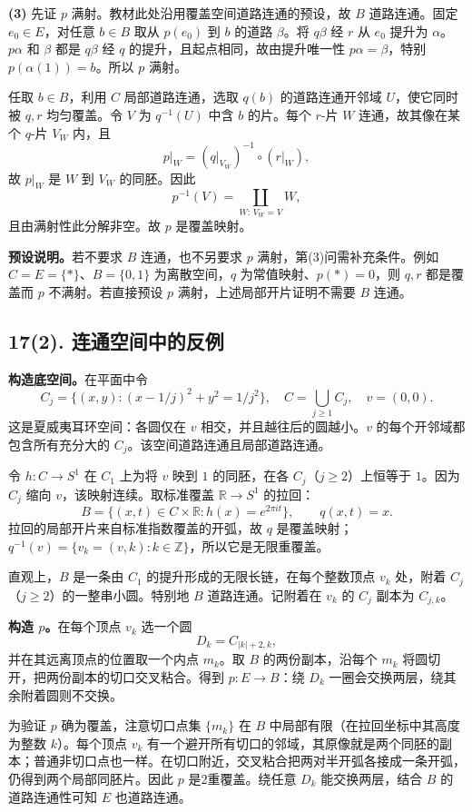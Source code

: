 \documentclass[UTF8,11pt,a4paper]{ctexart}
\newcommand{\R}{\mathbb R}\newcommand{\Z}{\mathbb Z}\newcommand{\C}{\mathbb C}
\begin{document}
\textbf{(3)} 先证 $p$ 满射。教材此处沿用覆盖空间道路连通的预设，故 $B$ 道路连通。固定 $e_0\in E$，对任意 $b\in B$ 取从 $p(e_0)$ 到 $b$ 的道路 $\beta$。将 $q\beta$ 经 $r$ 从 $e_0$ 提升为 $\alpha$。$p\alpha$ 和 $\beta$ 都是 $q\beta$ 经 $q$ 的提升，且起点相同，故由提升唯一性 $p\alpha=\beta$，特别 $p(\alpha(1))=b$。所以 $p$ 满射。

任取 $b\in B$，利用 $C$ 局部道路连通，选取 $q(b)$ 的道路连通开邻域 $U$，使它同时被 $q,r$ 均匀覆盖。令 $V$ 为 $q^{-1}(U)$ 中含 $b$ 的片。每个 $r$-片 $W$ 连通，故其像在某个 $q$-片 $V_W$ 内，且
\[p|_W=(q|_{V_W})^{-1}\circ(r|_W),\]
故 $p|_W$ 是 $W$ 到 $V_W$ 的同胚。因此
\[p^{-1}(V)=\coprod_{W:\,V_W=V}W,\]
且由满射性此分解非空。故 $p$ 是覆盖映射。

\textbf{预设说明。}若不要求 $B$ 连通，也不另要求 $p$ 满射，第(3)问需补充条件。例如 $C=E=\{*\}$、$B=\{0,1\}$ 为离散空间，$q$ 为常值映射、$p(*)=0$，则 $q,r$ 都是覆盖而 $p$ 不满射。若直接预设 $p$ 满射，上述局部开片证明不需要 $B$ 连通。
\newpage
\subsection*{17(2). 连通空间中的反例}
\textbf{构造底空间。}在平面中令
\[C_j=\{(x,y):(x-1/j)^2+y^2=1/j^2\},\quad
C=\bigcup_{j\ge1}C_j,\quad v=(0,0).\]
这是夏威夷耳环空间：各圆仅在 $v$ 相交，并且越往后的圆越小。$v$ 的每个开邻域都包含所有充分大的 $C_j$。该空间道路连通且局部道路连通。

令 $h:C\to S^1$ 在 $C_1$ 上为将 $v$ 映到 $1$ 的同胚，在各 $C_j$（$j\ge2$）上恒等于 $1$。因为 $C_j$ 缩向 $v$，该映射连续。取标准覆盖 $\R\to S^1$ 的拉回：
\[B=\{(x,t)\in C\times\R:h(x)=e^{2\pi it}\},\qquad q(x,t)=x.\]
拉回的局部开片来自标准指数覆盖的开弧，故 $q$ 是覆盖映射；$q^{-1}(v)=\{v_k=(v,k):k\in\Z\}$，所以它是无限重覆盖。

直观上，$B$ 是一条由 $C_1$ 的提升形成的无限长链，在每个整数顶点 $v_k$ 处，附着 $C_j$（$j\ge2$）的一整串小圆。特别地 $B$ 道路连通。记附着在 $v_k$ 的 $C_j$ 副本为 $C_{j,k}$。

\textbf{构造 $p$。}在每个顶点 $v_k$ 选一个圆
\[D_k=C_{|k|+2,k},\]
并在其远离顶点的位置取一个内点 $m_k$。取 $B$ 的两份副本，沿每个 $m_k$ 将圆切开，把两份副本的切口交叉粘合。得到 $p:E\to B$：绕 $D_k$ 一圈会交换两层，绕其余附着圆则不交换。

为验证 $p$ 确为覆盖，注意切口点集 $\{m_k\}$ 在 $B$ 中局部有限（在拉回坐标中其高度为整数 $k$）。每个顶点 $v_k$ 有一个避开所有切口的邻域，其原像就是两个同胚的副本；普通非切口点也一样。在切口附近，交叉粘合把两对半开弧各接成一条开弧，仍得到两个局部同胚片。因此 $p$ 是2重覆盖。绕任意 $D_k$ 能交换两层，结合 $B$ 的道路连通性可知 $E$ 也道路连通。
\end{document}
